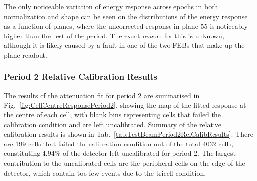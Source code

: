 The only noticeable variation of energy response across epochs in both normalization and shape can be seen on the distributions of the energy response as a function of planes, where the uncorrected response in plane 55 is noticeably higher than the rest of the period. The exact reason for this is unknown, although it is likely caused by a fault in one of the two \glspl{FEB} that make up the plane readout.

\subsubsection*{Period 2 Relative Calibration Results}

The results of the attenuation fit for period 2 are summarised in Fig.~\ref{fig:CellCentreResponsePeriod2}, showing the map of the fitted response at the centre of each cell, with blank bins representing cells that failed the calibration condition and are left uncalibrated. Summary of the relative calibration results is shown in Tab.~\ref{tab:TestBeamPeriod2RelCalibResults}. There are 199 cells that failed the calibration condition out of the total 4032 cells, constituting 4.94\% of the detector left uncalibrated for period 2. The largest contribution to the uncalibrated cells are the peripheral cells on the edge of the detector, which contain too few events due to the tricell condition.

